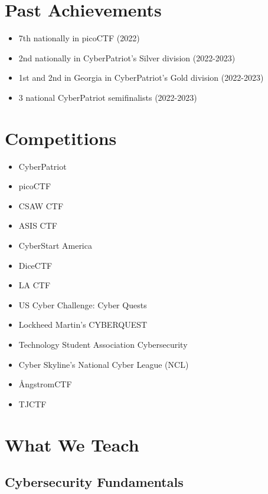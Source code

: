 \documentclass[
  letterpaper,
  DIV=11,
  numbers=noendperiod]{scrartcl}
\providecommand{\tightlist}{%
  \setlength{\itemsep}{0pt}\setlength{\parskip}{0pt}}\usepackage{longtable,booktabs,array}
\begin{document}
\hypertarget{past-achievements}{%
\section{Past Achievements}\label{past-achievements}}

\begin{itemize}
\tightlist
\item
  7th nationally in picoCTF (2022)
\item
  2nd nationally in CyberPatriot's Silver division (2022-2023)
\item
  1st and 2nd in Georgia in CyberPatriot's Gold division (2022-2023)
\item
  3 national CyberPatriot semifinalists (2022-2023)
\end{itemize}

\hypertarget{competitions}{%
\section{Competitions}\label{competitions}}

\begin{itemize}
\tightlist
\item
  CyberPatriot
\item
  picoCTF
\item
  CSAW CTF
\item
  ASIS CTF
\item
  CyberStart America
\item
  DiceCTF
\item
  LA CTF
\item
  US Cyber Challenge: Cyber Quests
\item
  Lockheed Martin's CYBERQUEST
\item
  Technology Student Association Cybersecurity
\item
  Cyber Skyline's National Cyber League (NCL)
\item
  ÅngstromCTF
\item
  TJCTF
\end{itemize}

\hypertarget{what-we-teach}{%
\section{What We Teach}\label{what-we-teach}}

\hypertarget{cybersecurity-fundamentals}{%
\subsection{Cybersecurity
Fundamentals}\label{cybersecurity-fundamentals}}
\end{document}

